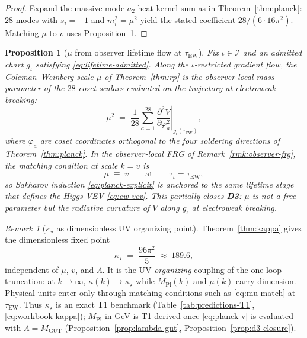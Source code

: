 \documentclass[11pt]{article}
\theoremstyle{plain}
\newtheorem{proposition}[theorem]{Proposition}
\theoremstyle{definition}
\theoremstyle{remark}
\newtheorem{remark}[theorem]{Remark}
\numberwithin{equation}{section}
\newcommand{\MPl}{M_{\mathrm{Pl}}}
\begin{document}
\begin{proof}
Expand the massive-mode $a_2$ heat-kernel sum as in
Theorem~\ref{thm:planck}: $28$ modes with $s_i=+1$ and $m_i^2=\mu^2$ yield
the stated coefficient $28/(6\cdot16\pi^2)$. Matching $\mu$ to $v$ uses
Proposition~\ref{prop:mu-lifetime}.
\end{proof}

\begin{proposition}[$\mu$ from observer lifetime flow at $\tau_{\mathrm{EW}}$]
\label{prop:mu-lifetime}
Fix $\iota\in\mathcal{I}$ and an admitted chart $g_\iota$ satisfying
\eqref{eq:lifetime-admitted}. Along the $\iota$-restricted gradient flow,
the Coleman--Weinberg scale $\mu$ of Theorem~\ref{thm:rp} is the
\emph{observer-local} mass parameter of the $28$ coset scalars evaluated on
the trajectory at electroweak breaking:
\begin{equation}\label{eq:mu-tau-ew}
  \mu^2
  \;=\;
  \frac{1}{28}\sum_{a=1}^{28}
  \left.\frac{\partial^2 V}{\partial\varphi_a^2}\right|_{g_\iota(\tau_{\mathrm{EW}})},
\end{equation}
where $\varphi_a$ are coset coordinates orthogonal to the four soldering
directions of Theorem~\ref{thm:planck}. In the observer-local FRG of
Remark~\ref{rmk:observer-frg}, the matching condition at scale $k=v$ is
\begin{equation}\label{eq:mu-match}
  \mu\;\equiv\;v
  \qquad\text{at}\qquad
  \tau_\iota=\tau_{\mathrm{EW}},
\end{equation}
so Sakharov induction \eqref{eq:planck-explicit} is anchored to the same
lifetime stage that defines the Higgs VEV \eqref{eq:ew-vev}. This partially
closes \textbf{D3}: $\mu$ is not a free parameter but the radiative curvature
of $V$ along $g_\iota$ at electroweak breaking.
\end{proposition}

\begin{remark}[$\kappa_\star$ as dimensionless UV organizing point]
\label{rmk:kappa-star-organizing}
Theorem~\ref{thm:kappa} gives the dimensionless fixed point
\begin{equation}\label{eq:kappa-star-value}
  \kappa_\star \;=\; \frac{96\pi^2}{5} \;\approx\; 189.6,
\end{equation}
independent of $\mu$, $v$, and $\Lambda$. It is the UV \emph{organizing}
coupling of the one-loop truncation: at $k\to\infty$,
$\kappa(k)\to\kappa_\star$ while $\MPl(k)$ and $\mu(k)$ carry dimension.
Physical units enter only through matching conditions such as
\eqref{eq:mu-match} at $\tau_{\mathrm{EW}}$. Thus $\kappa_\star$ is an exact
T1 benchmark (Table~\ref{tab:predictions-T1},
\eqref{eq:workbook-kappa}); $\MPl$ in GeV is T1 derived once
\eqref{eq:planck-v} is evaluated with $\Lambda=M_{\mathrm{GUT}}$
(Proposition~\ref{prop:lambda-gut}, Proposition~\ref{prop:d3-closure}).
\end{remark}
\end{document}
